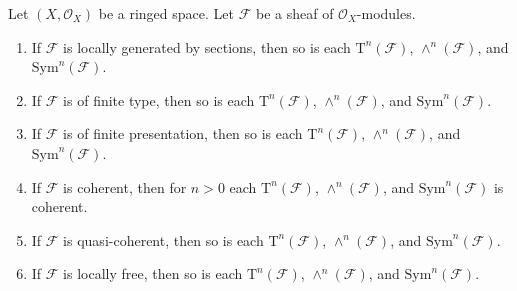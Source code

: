 \begin{lemma}
\label{lemma-tensor-algebra-permanence}
Let $(X, \mathcal{O}_X)$ be a ringed space.
Let $\mathcal{F}$ be a sheaf of $\mathcal{O}_X$-modules.
\begin{enumerate}
\item If $\mathcal{F}$ is locally generated by sections,
then so is each $\text{T}^n(\mathcal{F})$,
$\wedge^n(\mathcal{F})$, and $\text{Sym}^n(\mathcal{F})$.
\item If $\mathcal{F}$ is of finite type,
then so is each $\text{T}^n(\mathcal{F})$,
$\wedge^n(\mathcal{F})$, and $\text{Sym}^n(\mathcal{F})$.
\item If $\mathcal{F}$ is of finite presentation,
then so is each $\text{T}^n(\mathcal{F})$,
$\wedge^n(\mathcal{F})$, and $\text{Sym}^n(\mathcal{F})$.
\item If $\mathcal{F}$ is coherent,
then for $n > 0$ each $\text{T}^n(\mathcal{F})$,
$\wedge^n(\mathcal{F})$, and $\text{Sym}^n(\mathcal{F})$
is coherent.
\item If $\mathcal{F}$ is quasi-coherent,
then so is each $\text{T}^n(\mathcal{F})$,
$\wedge^n(\mathcal{F})$, and $\text{Sym}^n(\mathcal{F})$.
\item If $\mathcal{F}$ is locally free,
then so is each $\text{T}^n(\mathcal{F})$,
$\wedge^n(\mathcal{F})$, and $\text{Sym}^n(\mathcal{F})$.
\end{enumerate}
\end{lemma}

